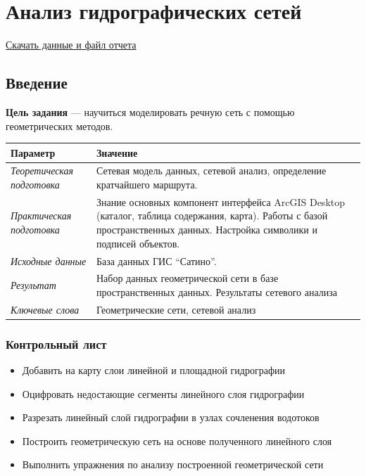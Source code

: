 \documentclass[12pt,]{book}
\providecommand{\tightlist}{%
  \setlength{\itemsep}{0pt}\setlength{\parskip}{0pt}}
\begin{document}
\hypertarget{network-hydro}{%
\chapter{Анализ гидрографических сетей}\label{network-hydro}}

\href{http://autolab.geogr.msu.ru/gis/data/Ex13.zip}{Скачать данные и файл отчета}

\hypertarget{network-hydro-intro}{%
\section{Введение}\label{network-hydro-intro}}

\textbf{Цель задания} --- научиться моделировать речную сеть с помощью геометрических методов.

\begin{longtable}[]{@{}ll@{}}
\toprule
Параметр & Значение\tabularnewline
\midrule
\endhead
\emph{Теоретическая подготовка} & Сетевая модель данных, сетевой анализ, определение кратчайшего маршрута.\tabularnewline
\emph{Практическая подготовка} & Знание основных компонент интерфейса ArcGIS Desktop (каталог, таблица содержания, карта). Работы с базой пространственных данных. Настройка символики и подписей объектов.\tabularnewline
\emph{Исходные данные} & База данных ГИС ``Сатино''.\tabularnewline
\emph{Результат} & Набор данных геометрической сети в базе пространственных данных. Результаты сетевого анализа\tabularnewline
\emph{Ключевые слова} & Геометрические сети, сетевой анализ\tabularnewline
\bottomrule
\end{longtable}

\hypertarget{network-hydro-control}{%
\subsection{Контрольный лист}\label{network-hydro-control}}

\begin{itemize}
\tightlist
\item
  Добавить на карту слои линейной и площадной гидрографии
\item
  Оцифровать недостающие сегменты линейного слоя гидрографии
\item
  Разрезать линейный слой гидрографии в узлах сочленения водотоков
\item
  Построить геометрическую сеть на основе полученного линейного слоя
\item
  Выполнить упражнения по анализу построенной геометрической сети
\end{itemize}
\end{document}
